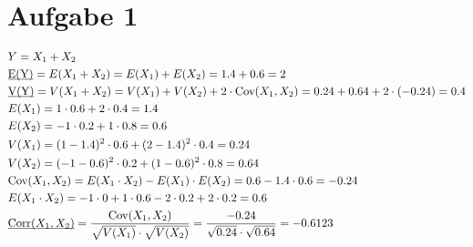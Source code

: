 \section*{Aufgabe 1}
\begin{align*}
  &Y=X_1 + X_2 \\
  &\underbar{E(Y)} = E(X_1 + X_2) = E(X_1) + E(X_2) = 1.4 + 0.6 = 2 \\
  &\underbar{V(Y)} = V(X_1 + X_2) = V(X_1) + V(X_2) + 2\cdot \text{Cov}(X_1,X_2) = 0.24 + 0.64 + 2\cdot (-0.24) = 0.4 \\
  &E(X_1) = 1\cdot 0.6 + 2\cdot 0.4 = 1.4 \\
  &E(X_2) = -1\cdot 0.2 + 1\cdot 0.8 = 0.6 \\
  &V(X_1) = (1-1.4)^2\cdot 0.6 + (2-1.4)^2\cdot 0.4 = 0.24 \\
  &V(X_2) = (-1-0.6)^2\cdot 0.2 + (1-0.6)^2\cdot 0.8 = 0.64 \\
  &\text{Cov}(X_1,X_2) = E(X_1\cdot X_2) - E(X_1)\cdot E(X_2) = 0.6-1.4\cdot 0.6 = -0.24 \\
  &E(X_1\cdot X_2) = -1\cdot 0 + 1\cdot 0.6 -2\cdot 0.2 + 2\cdot 0.2 = 0.6 \\ 
  &\underbar{\text{Corr}($X_1,X_2$)} = \frac{\text{Cov}(X_1,X_2)}{\sqrt{V(X_1)}\cdot\sqrt{ V(X_2)}} = \frac{-0.24}{ \sqrt{0.24}\cdot\sqrt{0.64}} = -0.6123
\end{align*}
